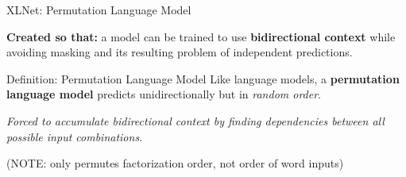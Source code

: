 \begin{frame}{XLNet: Permutation Language Model}
    
    \vspace{10pt}
    
    
    \footnotesize 
    
    \textbf{Created so that: } a model can be trained to use \textbf{bidirectional context} while avoiding masking and its resulting problem of independent predictions.

    \begin{definitionBlock}{Definition: Permutation Language Model}
    Like language models, a \textbf{permutation language model} predicts unidirectionally but in \emph{random order}. \newline 
    
    \emph{Forced to accumulate bidirectional context by finding dependencies between \emph{all} possible input combinations.} \newline 
    
    (NOTE: only permutes factorization order, not order of word inputs)
    \end{definitionBlock}
    
\end{frame}


